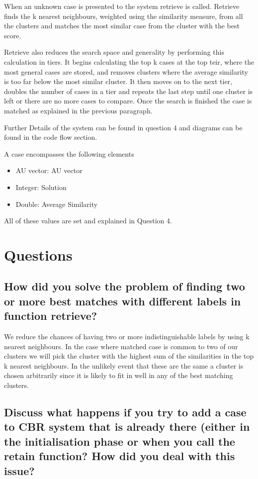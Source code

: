 \documentclass[11pt]{article}
\begin{document}
When an unknown case is presented to the system retrieve is called. Retrieve finds the k nearest neighbours, weighted using the similarity measure, from all the clusters and matches the most similar case from the cluster with the best score. 

Retrieve also reduces the search space and generality by performing this calculation in tiers. It begins calculating the top k cases at the top teir, where the most general cases are stored, and removes clusters where the average similarity is too far below the most similar cluster. It then moves on to the next tier, doubles the number of cases in a tier and repeats the last step until one cluster is left or there are no more cases to compare. Once the search is finished the case is matched as explained in the previous paragraph. 

Further Details of the system can be found in question 4 and diagrams can be found in the code flow section.

A case encompasses the following elements
\begin{itemize}
\item{AU vector:   AU vector         }
\item{Integer:     Solution          }
\item{Double:      Average Similarity}
\end{itemize}

All of these values are set and explained in Question 4.

\section{Questions}

\subsection{How did you solve the problem of finding two or more best matches with different labels in function retrieve?}

We reduce the chances of having two or more indistinguishable labels by using k nearest neighbours. In the case where matched case is common to two of our clusters we will pick the cluster with the highest sum of the similarities in the top k nearest neighbours. In the unlikely event that these are the same a cluster is chosen arbitrarily since it is likely to fit in well in any of the best matching clusters.

\subsection{Discuss what happens if you try to add a case to CBR system that is already there (either in the initialisation phase or when you call the retain function? How did you deal with this issue?}
\end{document}
